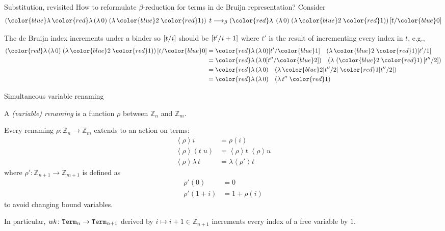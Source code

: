 \begin{frame}{Substitution, revisited}
  How to reformulate $\beta$-reduction for terms in de Bruijn representation? 
  Consider
  \[
    \left({\color{blue}\lambda}\, {\color{red}\lambda}\,(\lambda\,0) \;(\lambda\,{\color{blue} 2}\;{\color{red}1})\right)\;t
  \longrightarrow_{\beta}
  \left({\color{red}\lambda}\, \;(\lambda\,0) \;(\lambda\,{\color{blue} 2}\;{\color{red}1})\right)\subst{t}{\color{blue}0}
  \]

  The de Bruijn index increments under a binder so $[{t}/{i}]$ should be $[{t'}/{i+1}]$ where $t'$ is the result of incrementing every index in $t$, e.g., 
  \begin{align*}
      \left({\color{red}\lambda}\, (\lambda\,0) \;(\lambda\,{\color{blue} 2}\;{\color{red}1})\right)\subst{t}{\color{blue}0}
      & = 
      {\color{red}\lambda}\, (\lambda\,0)\subst{t'}{\color{blue}1} \quad(\lambda\,{\color{blue} 2}\;{\color{red}1})\subst{t'}{1} \\
      & =
      {\color{red}\lambda}\, (\lambda\,0\subst{t''}{\color{blue}2}) \quad(\lambda\,\left({\color{blue} 2}\;{\color{red}1}\right)\subst{t''}{2}) \\
      & =
      {\color{red}\lambda}\, (\lambda\,0) \quad(\lambda\, {\color{blue} 2}\subst{t''}{2}\;{\color{red}1}\subst{t''}{2}) \\
      & = 
      {\color{red}\lambda}\, (\lambda\,0) \quad(\lambda\, t''\;{\color{red}1})
  \end{align*}
  
\end{frame}


\begin{frame}{Simultaneous variable renaming}
  \begin{definition}
    A \emph{(variable) renaming} is a function $\rho$ between $\mathbb{Z}_n$ and $\mathbb{Z}_m$. 
  \end{definition}
  Every renaming $\rho\colon \mathbb{Z}_n \to \mathbb{Z}_m$ extends to an action on terms:
  \begin{align*}
    \left< \rho \right> i                 & = \rho(i)                                  \\
    \left< \rho \right> \left(t\;u\right) & = \left<\rho\right>t \; \left<\rho\right>u \\
    \left< \rho \right> \lambda\,t        & = \lambda\left< \rho' \right> t
  \end{align*}
  where $\rho' \colon \mathbb{Z}_{n+1} \to \mathbb{Z}_{m+1}$ is defined as 
  \begin{align*}
    \rho'(0) & = 0 \\
    \rho'(1 + i) & = 1 + \rho(i)
  \end{align*}
  to avoid changing bound variables. 
  
  In particular, $\mathit{wk}\colon \mathtt{Term}_{n} \to \mathtt{Term}_{n+1}$ derived by $i \mapsto i+1 \in \mathbb{Z}_{n+1}$ increments every index of a free variable by $1$.
\end{frame}

